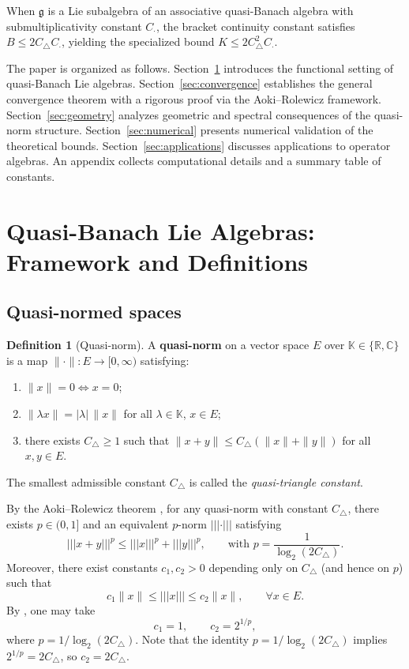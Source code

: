 \documentclass[10pt]{amsart}
\theoremstyle{definition}
\newtheorem{definition}[theorem]{Definition}
\theoremstyle{remark}
\numberwithin{equation}{section}
\newcommand{\field}{\mathbb{K}} %
\newcommand{\Ctri}{C_{\triangle}}    %
\newcommand{\Cmult}{C_{\cdot}}       %
\newcommand{\Cbracket}{B}            %
\newcommand{\Ctotal}{K}              %
\newcommand{\pnorm}[1]{\left\vert\!\left\vert\!\left\vert #1 \right\vert\!\right\vert\!\right\vert} %
\begin{document}
When $\mathfrak{g}$ is a Lie subalgebra of an associative quasi-Banach algebra with
submultiplicativity constant $\Cmult$, the bracket continuity constant satisfies
$\Cbracket \leq 2\Ctri\Cmult$, yielding the specialized bound
$\Ctotal \leq 2\Ctri^2\Cmult$.

The paper is organized as follows.  Section~\ref{sec:framework} introduces the functional
setting of quasi-Banach Lie algebras.  Section~\ref{sec:convergence} establishes the
general convergence theorem with a rigorous proof via the Aoki--Rolewicz framework.
Section~\ref{sec:geometry} analyzes geometric and spectral consequences of the quasi-norm
structure.  Section~\ref{sec:numerical} presents numerical validation of the theoretical
bounds.  Section~\ref{sec:applications} discusses applications to operator algebras.  An
appendix collects computational details and a summary table of constants.

\section{Quasi-Banach Lie Algebras: Framework and Definitions}\label{sec:framework}

\subsection{Quasi-normed spaces}

\begin{definition}[Quasi-norm]\label{def:quasinorm}
A \textbf{quasi-norm} on a vector space $E$ over $\field\in\{\mathbb{R},\mathbb{C}\}$ is a
map $\|\cdot\|:E\to[0,\infty)$ satisfying:
\begin{enumerate}[label=(\roman*)]
    \item $\|x\|=0 \iff x=0$;
    \item $\|\lambda x\| = |\lambda|\,\|x\|$ for all $\lambda\in\field$, $x\in E$;
    \item there exists $\Ctri\ge 1$ such that $\|x+y\|\le \Ctri(\|x\|+\|y\|)$ for all
          $x,y\in E$.
\end{enumerate}
The smallest admissible constant $\Ctri$ is called the \emph{quasi-triangle constant}.
\end{definition}

By the Aoki--Rolewicz theorem \cite{Aoki1942, Rolewicz1957}, for any quasi-norm with
constant $\Ctri$, there exists $p\in(0,1]$ and an equivalent $p$-norm $\pnorm{\cdot}$
satisfying
\[
  \pnorm{x+y}^p \le \pnorm{x}^p + \pnorm{y}^p, \qquad
  \text{with } p = \frac{1}{\log_2(2\Ctri)}.
\]
Moreover, there exist constants $c_1, c_2 > 0$ depending only on $\Ctri$ (and hence on
$p$) such that
\begin{equation}\label{eq:equiv}
  c_1 \|x\| \leq \pnorm{x} \leq c_2 \|x\|, \qquad \forall x \in E.
\end{equation}
By \cite[Proposition~1.3]{Kalton2003}, one may take
\begin{equation}\label{eq:c1c2}
  c_1 = 1, \qquad c_2 = 2^{1/p},
\end{equation}
where $p = 1/\log_2(2\Ctri)$.  Note that the identity $p = 1/\log_2(2\Ctri)$ implies
$2^{1/p} = 2\Ctri$, so $c_2 = 2\Ctri$.
\end{document}
